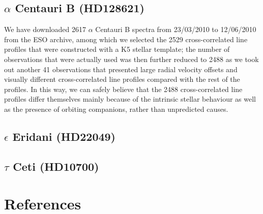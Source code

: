 \subsection{$\alpha$ Centauri B (HD128621)}

We have downloaded 2617 $\alpha$ Centauri B spectra from 23/03/2010 to 12/06/2010 from the ESO archive, among which we selected the 2529 cross-correlated line profiles that were constructed with a K5 stellar template; the number of observations that were actually used was then further reduced to 2488 as we took out another 41 observations that presented large radial velocity offsets and visually different cross-correlated line profiles compared with the rest of the profiles. In this way, we can safely believe that the 2488 cross-correlated line profiles differ themselves mainly because of the intrinsic stellar behaviour as well as the presence of orbiting companions, rather than unpredicted causes.

 


\subsection{$\epsilon$ Eridani (HD22049)}

\subsection{$\tau$ Ceti (HD10700)}




\FloatBarrier

\section{References}
\label{\thesection}
\vspace{-1.5cm}


